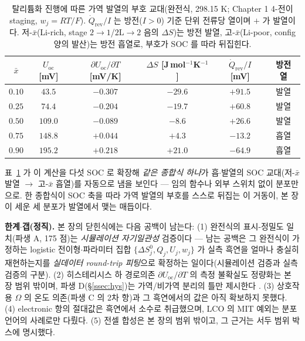 \documentclass[11pt,a4paper]{article}
\newcommand{\rev}{\mathrm{rev}}
\newcommand{\oc}{\mathrm{oc}}
\begin{document}
\begin{table}[t]
\centering\small
\renewcommand{\arraystretch}{1.25}
\caption{탈리튬화 진행에 따른 가역 발열의 부호 교대(완전식, 298.15 K; Chapter 1 4-전이 staging, $w_j{=}RT/F$). $\dot Q_\rev/I$ 는
방전($I>0$) 기준 단위 전류당 열이며 $+$ 가 발열이다. 저-$\bar x$(Li-rich, stage $2\!\to\!1$/$2\mathrm L\!\to\!2$
음의 $\Delta S$)는 방전 발열, 고-$\bar x$(Li-poor, config 양의 발산)는 방전 흡열로, 부호가 SOC 를 따라 뒤집힌다.}
\label{tab:qrev}
\begin{tabular}{cccccc}
\toprule
$\bar x$ & $U_\oc$ [mV] & $\partial U_\oc/\partial T$ [mV/K] & $\Delta S$ [J\,mol$^{-1}$K$^{-1}$] & $\dot Q_\rev/I$ [mV] & 방전 열 \\
\midrule
$0.10$ & $43.5$  & $-0.307$ & $-29.6$ & $+91.5$ & 발열 \\
$0.25$ & $74.4$  & $-0.204$ & $-19.7$ & $+60.8$ & 발열 \\
$0.50$ & $109.0$ & $-0.089$ & $-8.6$  & $+26.6$ & 발열 \\
$0.75$ & $148.8$ & $+0.044$ & $+4.3$  & $-13.2$ & 흡열 \\
$0.90$ & $195.2$ & $+0.218$ & $+21.0$ & $-64.9$ & 흡열 \\
\bottomrule
\end{tabular}
\end{table}

표~\ref{tab:qrev} 가 이 계산을 다섯 SOC 로 확장해 \emph{같은 종합식 하나}가 흡$\cdot$발열의 SOC 교대(저-$\bar x$
발열 $\to$ 고-$\bar x$ 흡열)를 자동으로 냄을 보인다 — 임의 함수나 외부 스위치 없이 분포만으로. 한 종합식이
SOC 축을 따라 가역 발열의 부호를 스스로 뒤집는 이 거동이, 본 장이 세운 세 분포가 발열에서 맺는 매듭이다.

\textbf{한계$\cdot$갭(정직).} 본 장의 닫힌식에는 다음 공백이 남는다: (1) 완전식의 표시-정밀도 일치(파생 A,
175 점)는 \emph{시뮬레이션 자기일관성} 검증이다 — 남는 공백은 그 완전식이 가정하는 logistic
전이형$\cdot$파라미터 집합 $\{\Delta S^0_j,Q_j,U_j,w_j\}$ 가 실측 흑연을 얼마나 충실히 재현하는지를
\emph{실데이터 round-trip 피팅}으로 확정하는 일이다(시뮬레이션 검증과 실측 검증의 구분). (2) 히스테리시스 하 경로의존 $\partial U_\oc/\partial T$ 의 측정 불확실도
정량화는 본 장 범위 밖이며, 파생 D(\S\ref{ssec:hys})는 가역/비가역 분리의 틀만 제시한다 \cite{hysteresis2018}. (3) 상호작용
$\Omega$ 의 온도 의존(파생 C 의 2차 항)과 그 흑연에서의 값은 아직 확보하지 못했다. (4) electronic 항의 절대값은
흑연에서 소수로 취급했으며, LCO 의 MIT 예외는 분포 언어의 사례로만 다뤘다. (5) 전셀 합성은 본 장의 범위
밖이고, 그 근거는 서두 범위 박스에 명시했다.
\end{document}
